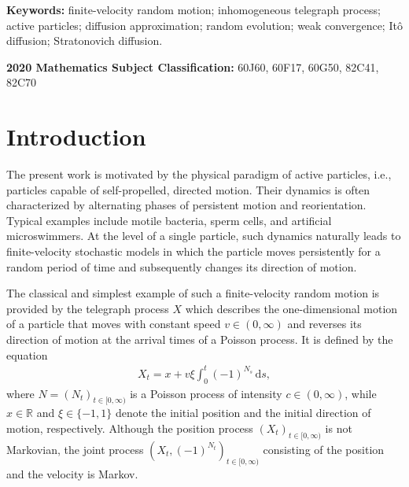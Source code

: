 \documentclass[10pt]{article}
\newcommand{\1}{1\!\!\!\;{\rm I}}
\theoremstyle{plain}
\theoremstyle{definition}
\newcommand{\ba}{\begin{equation}\begin{aligned}}
\newcommand{\ea}{\end{aligned}\end{equation}}
\newcommand{\di}{\mathrm{d}}
\numberwithin{equation}{section}
\begin{document}
\noindent
\textbf{Keywords:}  finite-velocity random motion; inhomogeneous telegraph process; active particles;
diffusion approximation; random evolution; weak convergence; It\^o diffusion; Stratonovich diffusion.


\smallskip

\noindent
\textbf{2020 Mathematics Subject Classification:}
60J60, %
60F17, %
60G50,  %
82C41,  %
82C70  %

\begin{footnotesize}\tableofcontents\end{footnotesize}

\section{Introduction}

The present work is motivated by the physical paradigm of active particles,
i.e., particles capable of self-propelled, directed motion. Their dynamics is often
characterized by alternating phases of persistent motion and reorientation.
Typical examples include motile bacteria, sperm cells, and artificial microswimmers.
At the level of a single particle, such dynamics naturally leads to finite-velocity stochastic
models in which the particle moves persistently for a random period of time and subsequently
changes its direction of motion.

The classical and simplest example of such a finite-velocity random motion
is provided by the telegraph process $X$ which describes the one-dimensional motion
of a particle that moves with constant speed $v\in(0,\infty)$ and reverses its direction of
motion at the arrival times of a Poisson process. It is defined by the equation
\ba
\label{e:t1}
X_t = x + v\xi \int_0^t (-1)^{N_s}\,\di s,
\ea
where $N=(N_t)_{t\in[0,\infty)}$ is a Poisson process of intensity $c\in(0,\infty)$,
while $x\in\mathbb{R}$ and $\xi\in\{-1,1\}$ denote the initial position and the initial direction of motion,
respectively. Although the position process $(X_t)_{t\in[0,\infty)}$ is not Markovian,
the joint process $(X_t,(-1)^{N_t})_{t\in[0,\infty)}$ consisting of the position and the velocity is Markov.
\end{document}
